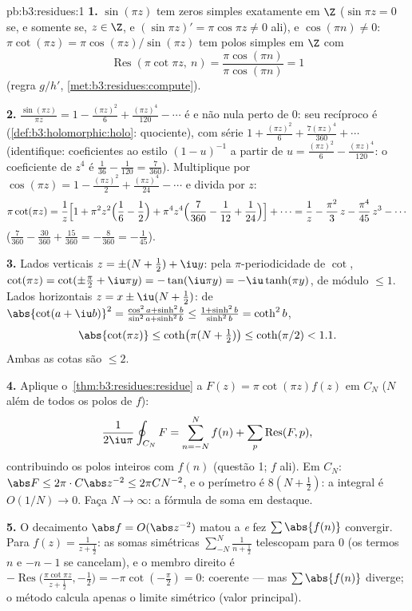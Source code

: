 \begin{solution}{pb:b3:residues:1}
\textbf{1.} $\sin(\pi z)$ tem zeros simples exatamente em $\Z$
($\sin\pi z = 0$ se, e somente se, $z \in \Z$, e $(\sin\pi z)' = \pi\cos\pi
z \neq 0$ ali), e $\cos(\pi n) \neq 0$: $\pi\cot(\pi z) =
\pi\cos(\pi z)/\sin(\pi z)$ tem polos simples em $\Z$ com
\[
\operatorname{Res}(\pi\cot\pi z,\ n)
= \frac{\pi\cos(\pi n)}{\pi\cos(\pi n)} = 1
\]
(regra $g/h'$, \cref{met:b3:residues:compute}).

\textbf{2.} $\frac{\sin(\pi z)}{\pi z} = 1 - \frac{(\pi z)^2}6
+ \frac{(\pi z)^4}{120} - \cdots$ é  e não nula
perto de $0$: seu recíproco é 
(\cref{def:b3:holomorphic:holo}: quociente), com série $1 +
\frac{(\pi z)^2}{6} + \frac{7(\pi z)^4}{360} + \cdots$
(identifique: coeficientes ao estilo $(1 - u)^{-1}$ a partir de $u =
\frac{(\pi z)^2}6 - \frac{(\pi z)^4}{120}$: o coeficiente de $z^4$
é $\frac1{36} - \frac1{120} = \frac{7}{360}$).
Multiplique por $\cos(\pi z) = 1 - \frac{(\pi z)^2}2 + \frac{(\pi
z)^4}{24} - \cdots$ e divida por $z$:
\[
\pi\cot(\pi z) = \frac1z\Bigl[1 + \pi^2z^2\Bigl(\frac16 -
\frac12\Bigr) + \pi^4z^4\Bigl(\frac7{360} - \frac1{12} +
\frac1{24}\Bigr)\Bigr] + \cdots
= \frac1z - \frac{\pi^2}3\,z - \frac{\pi^4}{45}\,z^3 -
\cdots
\]
($\frac7{360} - \frac{30}{360} + \frac{15}{360} =
-\frac8{360} = -\frac1{45}$).

\textbf{3.} Lados verticais $z = \pm(N + \frac12) + \iu y$:
pela $\pi$-periodicidade de $\cot$, $\cot(\pi z) = \cot(\pm\frac\pi2
+ \iu\pi y) = -\tan(\iu\pi y) = -\iu\tanh(\pi y)$, de módulo
$\leq 1$. Lados horizontais $z = x \pm \iu(N + \frac12)$: de
$\abs{\cot(a + \iu b)}^2 = \frac{\cos^2a +
\sinh^2b}{\sin^2a + \sinh^2b} \leq \frac{1 +
\sinh^2b}{\sinh^2b} = \coth^2 b$,
\[
\abs{\cot(\pi z)} \leq \coth\bigl(\pi(N + \tfrac12)\bigr)
\leq \coth(\pi/2) < 1.1 .
\]
Ambas as cotas são $\leq 2$.

\textbf{4.} Aplique o~\cref{thm:b3:residues:residue} a $F(z) =
\pi\cot(\pi z)f(z)$ em $C_N$ ($N$ além de todos os polos de $f$):
\[
\frac1{2\iu\pi}\oint_{C_N}F = \sum_{n=-N}^{N}f(n) +
\sum_p\operatorname{Res}(F, p),
\]
contribuindo os polos inteiros com $f(n)$ (questão 1; $f$
 ali). Em $C_N$: $\abs F \leq 2\pi\cdot
C\abs z^{-2} \leq 2\pi C N^{-2}$, e o perímetro é $8(N +
\frac12)$: a integral é $O(1/N) \to 0$. Faça $N \to
\infty$: a fórmula de soma em destaque.

\textbf{5.} O decaimento $\abs f = O(\abs z^{-2})$ matou a
 \emph{e} fez $\sum\abs{f(n)}$ convergir.
Para $f(z) = \frac1{z + \frac12}$: as somas simétricas
$\sum_{-N}^N\frac1{n + \frac12}$ telescopam para $0$ (os termos
$n$ e $-n - 1$ se cancelam), e o membro direito é
$-\operatorname{Res}\bigl(\frac{\pi\cot\pi z}{z + \frac12},
-\frac12\bigr) = -\pi\cot(-\frac\pi2) = 0$: coerente ---
mas $\sum\abs{f(n)}$ diverge; o método calcula apenas o
limite simétrico (valor principal).


\end{solution}
